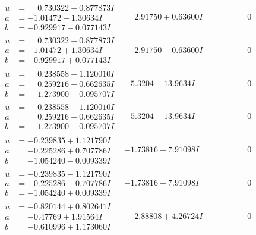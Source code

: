 \documentclass[1p]{elsarticle_modified}
\theoremstyle{definition}
\begin{document}
$$\begin{array}{c|c|c}
\begin{aligned}
u &= \phantom{-}0.730322 + 0.877873 I \\
a &= -1.01472 - 1.30634 I \\
b &= -0.929917 - 0.077143 I\end{aligned}
 & \phantom{-}2.91750 + 0.63600 I & \phantom{-0.000000 } 0 \\ \hline\begin{aligned}
u &= \phantom{-}0.730322 - 0.877873 I \\
a &= -1.01472 + 1.30634 I \\
b &= -0.929917 + 0.077143 I\end{aligned}
 & \phantom{-}2.91750 - 0.63600 I & \phantom{-0.000000 } 0 \\ \hline\begin{aligned}
u &= \phantom{-}0.238558 + 1.120010 I \\
a &= \phantom{-}0.259216 + 0.662635 I \\
b &= \phantom{-}1.273900 - 0.095707 I\end{aligned}
 & -5.3204 + 13.9634 I & \phantom{-0.000000 } 0 \\ \hline\begin{aligned}
u &= \phantom{-}0.238558 - 1.120010 I \\
a &= \phantom{-}0.259216 - 0.662635 I \\
b &= \phantom{-}1.273900 + 0.095707 I\end{aligned}
 & -5.3204 - 13.9634 I & \phantom{-0.000000 } 0 \\ \hline\begin{aligned}
u &= -0.239835 + 1.121790 I \\
a &= -0.225286 + 0.707786 I \\
b &= -1.054240 - 0.009339 I\end{aligned}
 & -1.73816 - 7.91098 I & \phantom{-0.000000 } 0 \\ \hline\begin{aligned}
u &= -0.239835 - 1.121790 I \\
a &= -0.225286 - 0.707786 I \\
b &= -1.054240 + 0.009339 I\end{aligned}
 & -1.73816 + 7.91098 I & \phantom{-0.000000 } 0 \\ \hline\begin{aligned}
u &= -0.820144 + 0.802641 I \\
a &= -0.47769 + 1.91564 I \\
b &= -0.610996 + 1.173060 I\end{aligned}
 & \phantom{-}2.88808 + 4.26724 I & \phantom{-0.000000 } 0\\

\end{array}$$
\end{document}
